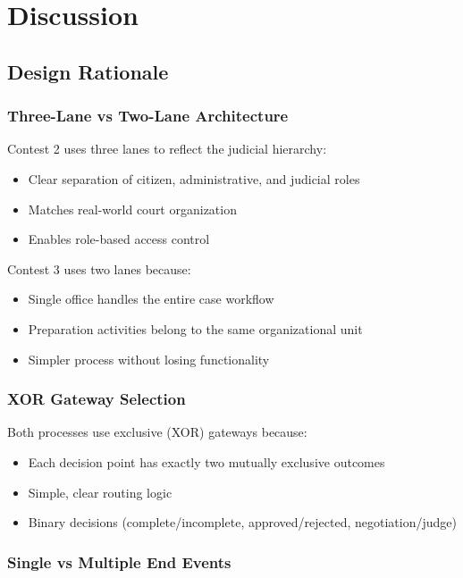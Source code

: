 \documentclass[12pt,a4paper]{article}
\begin{document}
\section{Discussion}

\subsection{Design Rationale}

\subsubsection{Three-Lane vs Two-Lane Architecture}

Contest 2 uses three lanes to reflect the judicial hierarchy:
\begin{itemize}
    \item Clear separation of citizen, administrative, and judicial roles
    \item Matches real-world court organization
    \item Enables role-based access control
\end{itemize}

Contest 3 uses two lanes because:
\begin{itemize}
    \item Single office handles the entire case workflow
    \item Preparation activities belong to the same organizational unit
    \item Simpler process without losing functionality
\end{itemize}

\subsubsection{XOR Gateway Selection}

Both processes use exclusive (XOR) gateways because:
\begin{itemize}
    \item Each decision point has exactly two mutually exclusive outcomes
    \item Simple, clear routing logic
    \item Binary decisions (complete/incomplete, approved/rejected, negotiation/judge)
\end{itemize}

\subsubsection{Single vs Multiple End Events}
\end{document}
